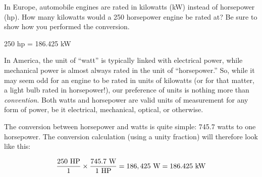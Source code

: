 

In Europe, automobile engines are rated in kilowatts (kW) instead of horsepower (hp).  How many kilowatts would a 250 horsepower engine be rated at?  Be sure to show how you performed the conversion.







250 hp = 186.425 kW

\vskip 10pt

In America, the unit of ``watt'' is typically linked with electrical power, while mechanical power is almost always rated in the unit of ``horsepower.''  So, while it may seem odd for an engine to be rated in units of kilowatts (or for that matter, a light bulb rated in horsepower!), our preference of units is nothing more than {\it convention}.  Both watts and horsepower are valid units of measurement for any form of power, be it electrical, mechanical, optical, or otherwise.

The conversion between horsepower and watts is quite simple: 745.7 watts to one horsepower.  The conversion calculation (using a unity fraction) will therefore look like this:

$${250 \hbox{ HP} \over 1} \times {745.7 \hbox{ W} \over 1 \hbox{ HP}} = 186,425 \hbox{ W} = 186.425 \hbox{ kW}$$











